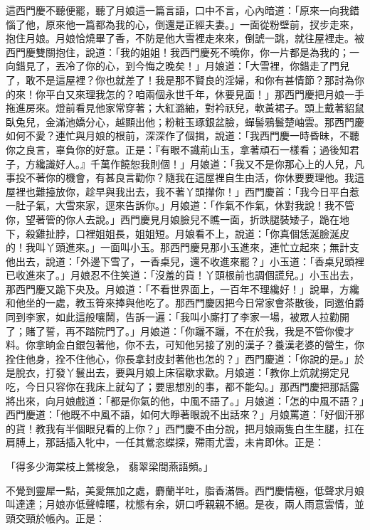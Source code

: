 這西門慶不聽便罷，聽了月娘這一篇言語，口中不言，心內暗道：「原來一向我錯惱了他，原來他一篇都為我的心，倒還是正經夫妻。」一面從粉壁前，扠步走來，抱住月娘。月娘恰燒畢了香，不防是他大雪裡走來來，倒諕一跳，就往屋裡走。被西門慶雙關抱住，說道：「我的姐姐！我西門慶死不曉你，你一片都是為我的；一向錯見了，丟冷了你的心，到今悔之晚矣！」月娘道：「大雪裡，你錯走了門兒了，敢不是這屋裡？你也就差了！我是那不賢良的淫婦，和你有甚情節？那討為你的來！你平白又來理我怎的？咱兩個永世千年，休要見面！」那西門慶把月娘一手拖進房來。燈前看見他家常穿著；大紅潞紬，對衿祆兒，軟黃裙子。頭上戴著貂鼠臥兔兒，金滿池嬌分心，越顯出他；粉粧玉琢銀盆臉，蟬髻鴉鬟楚岫雲。那西門慶如何不愛？連忙與月娘的根前，深深作了個揖，說道：「我西門慶一時昏昧，不聽你之良言，辜負你的好意。正是：『有眼不識荊山玉，拿著頑石一樣看；過後知君子，方纔識好人。』千萬作饒恕我則個！」月娘道：「我又不是你那心上的人兒，凡事投不著你的機會，有甚良言勸你？隨我在這屋裡自生由活，你休要要理他。我這屋裡也難擡放你，趁早與我出去，我不著丫頭攆你！」西門慶首：「我今日平白惹一肚子氣，大雪來家，逕來告訴你。」月娘道：「作氣不作氣，休對我說！我不管你，望著管的你人去說。」西門慶見月娘臉兒不瞧一面，折跌腿裝矮子，跪在地下，殺雞扯脖，口裡姐姐長，姐姐短。月娘看不上，說道：「你真個恁涎臉涎皮的！我叫丫頭進來。」一面叫小玉。那西門慶見那小玉進來，連忙立起來；無計支他出去，說道：「外邊下雪了，一香桌兒，還不收進來罷？」小玉道：「香桌兒頭裡已收進來了。」月娘忍不住笑道：「沒羞的貨！丫頭根前也調個謊兒。」小玉出去，那西門慶又跪下央及。月娘道：「不看世界面上，一百年不理纔好！」說畢，方纔和他坐的一處，教玉筲來捧與他吃了。那西門慶因把今日常家會茶散後，同邀伯爵同到李家，如此這般嚷鬧，告訴一遍：「我叫小廝打了李家一場，被眾人拉勸開了；賭了誓，再不踏院門了。」月娘道：「你躧不躧，不在於我，我是不管你傻才料。你拿晌金白銀包著他，你不去，可知他另接了別的漢子？養漢老婆的營生，你拴住他身，拴不住他心，你長拿封皮封著他也怎的？」西門慶道：「你說的是。」於是脫衣，打發丫鬟出去，要與月娘上床宿歇求歡。月娘道：「教你上炕就撈定兒吃，今日只容你在我床上就勾了；要思想別的事，都不能勾。」那西門慶把那話露將出來，向月娘戲道：「都是你氣的他，中風不語了。」月娘道：「怎的中風不語？」西門慶道：「他既不中風不語，如何大睜著眼說不出話來？」月娘罵道：「好個汗邪的貨！教我有半個眼兒看的上你？」西門慶不由分說，把月娘兩隻白生生腿，扛在肩膊上，那話插入牝中，一任其鶯恣蝶探，殢雨尤雲，未肯即休。正是：

「得多少海棠枝上鶯梭急， 翡翠梁間燕語頻。」

不覺到靈犀一點，美愛無加之處，麝蘭半吐，脂香滿唇。西門慶情極，低聲求月娘叫達達；月娘亦低聲幃暱，枕態有余，妍口呼親親不絕。是夜，兩人雨意雲情，並頭交頸於帳內。正是：

